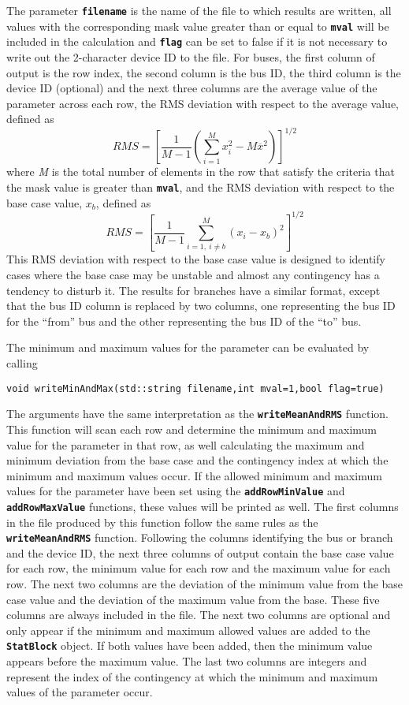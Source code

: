 The parameter \texttt{\textbf{filename}} is the name of the file to which results are written, all values with the corresponding mask value greater than or equal to \texttt{\textbf{mval}} will be included in the calculation and \texttt{\textbf{flag}} can be set to false if it is not necessary to write out the 2-character device ID to the file. For buses, the first column of output is the row index, the second column is the bus ID, the third column is the device ID (optional) and the next three columns are the average value of the parameter across each row, the RMS deviation with respect to the average value, defined as
\[
RMS={\left[\frac{1}{M-1}\left(\sum^M_{i=1}{x^2_i-M{\overline{x}}^2}\right)\right]}^{1/2}
\] 
where \textit{M} is the total number of elements in the row that satisfy the
criteria that the mask value is greater than \texttt{\textbf{mval}}, and the RMS
deviation with respect to the base case value, $x_b$, defined as
\[
RMS={\left[\frac{1}{M-1}\sum^M_{i=1,\ i\neq b}{{\left(x_i-x_b\right)}^2}\right]}^{1/2}
\] 
This RMS deviation with respect to the base case value is designed to identify
cases where the base case may be unstable and almost any contingency has a
tendency to disturb it.
The results for branches have a similar format, except that the bus ID column is replaced by two columns, one representing the bus ID for the ``from'' bus and the other representing the bus ID of the ``to'' bus.

The minimum and maximum values for the parameter can be evaluated by calling

{
\color{red}
\begin{Verbatim}[fontseries=b]
void writeMinAndMax(std::string filename,int mval=1,bool flag=true)
\end{Verbatim}
}

The arguments have the same interpretation as the \texttt{\textbf{writeMeanAndRMS}} function. This function will scan each row and determine the minimum and maximum value for the parameter in that row, as well calculating the maximum and minimum deviation from the base case and the contingency index at which the minimum and maximum values occur. If the allowed minimum and maximum values for the parameter have been set using the \texttt{\textbf{addRowMinValue}} and \texttt{\textbf{addRowMaxValue}} functions, these values will be printed as well. The first columns in the file produced by this function follow the same rules as the \texttt{\textbf{writeMeanAndRMS}} function. Following the columns identifying the bus or branch and the device ID, the next three columns of output contain the base case value for each row, the minimum value for each row and the maximum value for each row.  The next two columns are the deviation of the minimum value from the base case value and the deviation of the maximum value from the base. These five columns are always included in the file. The next two columns are optional and only appear if the minimum and maximum allowed values are added to the \texttt{\textbf{StatBlock}} object. If both values have been added, then the minimum value appears before the maximum value. The last two columns are integers and represent the index of the contingency at which the minimum and maximum values of the parameter occur.

